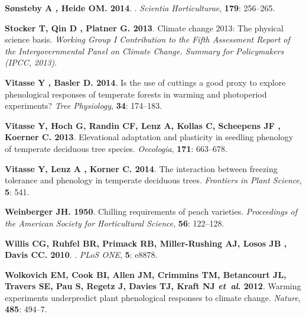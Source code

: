 \documentclass[11pt]{article}
\begin{document}
\begin{thebibliography}{69}
{\bf S{\o}nsteby A , Heide OM}{\bf . 2014}.
.
\newblock \emph{Scientia Horticulturae}, {\bf 179}: 256--265.

{\bf Stocker T, Qin D , Platner G}{\bf . 2013}.
\newblock Climate change 2013: The physical science basis.
\newblock \emph{Working Group I Contribution to the Fifth Assessment Report of
  the Intergovernmental Panel on Climate Change. Summary for Policymakers
  (IPCC, 2013)}.

{\bf Vitasse Y , Basler D}{\bf . 2014}.
\newblock Is the use of cuttings a good proxy to explore phenological responses
  of temperate forests in warming and photoperiod experiments?
\newblock \emph{Tree Physiology}, {\bf 34}: 174--183.

{\bf Vitasse Y, Hoch G, Randin CF, Lenz A, Kollas C, Scheepens JF , Koerner
  C}{\bf . 2013}.
\newblock Elevational adaptation and plasticity in seedling phenology of
  temperate deciduous tree species.
\newblock \emph{Oecologia}, {\bf 171}: 663--678.

{\bf Vitasse Y, Lenz A , Korner C}{\bf . 2014}.
\newblock The interaction between freezing tolerance and phenology in temperate
  deciduous trees.
\newblock \emph{Frontiers in Plant Science}, {\bf 5}: 541.

{\bf Weinberger JH}{\bf . 1950}.
\newblock Chilling requirements of peach varieties.
\newblock \emph{Proceedings of the American Society for Horticultural Science},
  {\bf 56}: 122--128.

{\bf Willis CG, Ruhfel BR, Primack RB, Miller-Rushing AJ, Losos JB , Davis
  CC}{\bf . 2010}.
.
\newblock \emph{PLoS ONE}, {\bf 5}: e8878.

{\bf Wolkovich EM, Cook BI, Allen JM, Crimmins TM, Betancourt JL, Travers SE,
  Pau S, Regetz J, Davies TJ, Kraft NJ \emph{et~al}}{\bf . 2012}.
\newblock Warming experiments underpredict plant phenological responses to
  climate change.
\newblock \emph{Nature}, {\bf 485}: 494--7.


\end{thebibliography}
\end{document}

